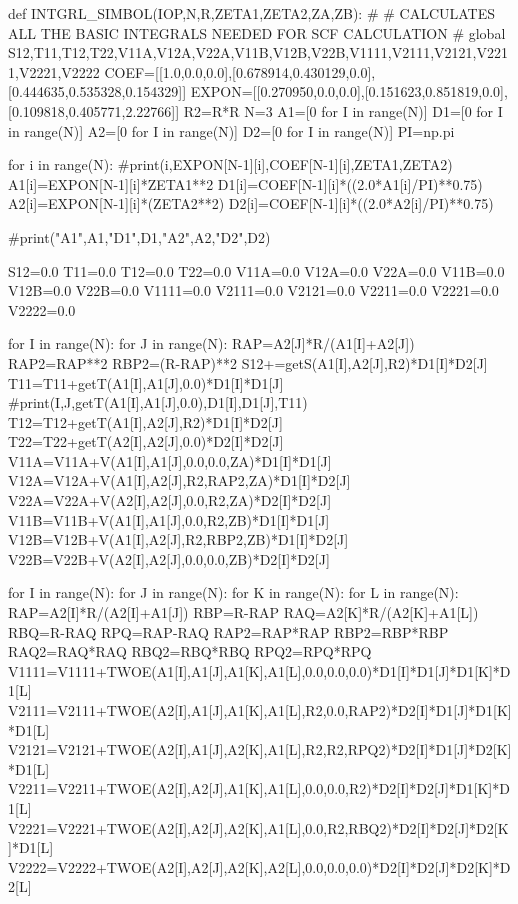 def INTGRL_SIMBOL(IOP,N,R,ZETA1,ZETA2,ZA,ZB):
#
#  CALCULATES ALL THE BASIC INTEGRALS NEEDED FOR SCF CALCULATION
#
    global S12,T11,T12,T22,V11A,V12A,V22A,V11B,V12B,V22B,V1111,V2111,V2121,V2211,V2221,V2222
    COEF=[[1.0,0.0,0.0],[0.678914,0.430129,0.0],[0.444635,0.535328,0.154329]]
    EXPON=[[0.270950,0.0,0.0],[0.151623,0.851819,0.0],[0.109818,0.405771,2.22766]]
    R2=R*R
    N=3
    A1=[0 for I in range(N)]
    D1=[0 for I in range(N)]
    A2=[0 for I in range(N)]
    D2=[0 for I in range(N)]
    PI=np.pi

    for i in range(N):
        #print(i,EXPON[N-1][i],COEF[N-1][i],ZETA1,ZETA2)
        A1[i]=EXPON[N-1][i]*ZETA1**2
        D1[i]=COEF[N-1][i]*((2.0*A1[i]/PI)**0.75)
        A2[i]=EXPON[N-1][i]*(ZETA2**2)
        D2[i]=COEF[N-1][i]*((2.0*A2[i]/PI)**0.75)

    #print("A1",A1,"D1",D1,"A2",A2,"D2",D2)
        
    S12=0.0
    T11=0.0
    T12=0.0
    T22=0.0
    V11A=0.0
    V12A=0.0
    V22A=0.0
    V11B=0.0
    V12B=0.0
    V22B=0.0
    V1111=0.0
    V2111=0.0
    V2121=0.0
    V2211=0.0
    V2221=0.0
    V2222=0.0
    
    for I in range(N):
        for J in range(N):
            RAP=A2[J]*R/(A1[I]+A2[J])
            RAP2=RAP**2
            RBP2=(R-RAP)**2
            S12+=getS(A1[I],A2[J],R2)*D1[I]*D2[J]
            T11=T11+getT(A1[I],A1[J],0.0)*D1[I]*D1[J]
            #print(I,J,getT(A1[I],A1[J],0.0),D1[I],D1[J],T11)
            T12=T12+getT(A1[I],A2[J],R2)*D1[I]*D2[J]
            T22=T22+getT(A2[I],A2[J],0.0)*D2[I]*D2[J]
            V11A=V11A+V(A1[I],A1[J],0.0,0.0,ZA)*D1[I]*D1[J]
            V12A=V12A+V(A1[I],A2[J],R2,RAP2,ZA)*D1[I]*D2[J]
            V22A=V22A+V(A2[I],A2[J],0.0,R2,ZA)*D2[I]*D2[J]
            V11B=V11B+V(A1[I],A1[J],0.0,R2,ZB)*D1[I]*D1[J]
            V12B=V12B+V(A1[I],A2[J],R2,RBP2,ZB)*D1[I]*D2[J]
            V22B=V22B+V(A2[I],A2[J],0.0,0.0,ZB)*D2[I]*D2[J]
        
    for I in range(N):
        for J in range(N):
            for K in range(N):
                for L in range(N):
                    RAP=A2[I]*R/(A2[I]+A1[J])
                    RBP=R-RAP
                    RAQ=A2[K]*R/(A2[K]+A1[L])
                    RBQ=R-RAQ
                    RPQ=RAP-RAQ
                    RAP2=RAP*RAP
                    RBP2=RBP*RBP
                    RAQ2=RAQ*RAQ
                    RBQ2=RBQ*RBQ
                    RPQ2=RPQ*RPQ
                    V1111=V1111+TWOE(A1[I],A1[J],A1[K],A1[L],0.0,0.0,0.0)*D1[I]*D1[J]*D1[K]*D1[L]
                    V2111=V2111+TWOE(A2[I],A1[J],A1[K],A1[L],R2,0.0,RAP2)*D2[I]*D1[J]*D1[K]*D1[L]
                    V2121=V2121+TWOE(A2[I],A1[J],A2[K],A1[L],R2,R2,RPQ2)*D2[I]*D1[J]*D2[K]*D1[L]
                    V2211=V2211+TWOE(A2[I],A2[J],A1[K],A1[L],0.0,0.0,R2)*D2[I]*D2[J]*D1[K]*D1[L]
                    V2221=V2221+TWOE(A2[I],A2[J],A2[K],A1[L],0.0,R2,RBQ2)*D2[I]*D2[J]*D2[K]*D1[L]
                    V2222=V2222+TWOE(A2[I],A2[J],A2[K],A2[L],0.0,0.0,0.0)*D2[I]*D2[J]*D2[K]*D2[L]

